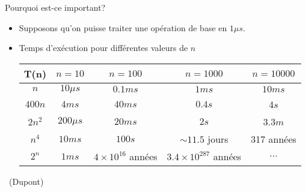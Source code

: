 \begin{frame}{Pourquoi est-ce important?}

\begin{itemize}
\item Supposons qu'on puisse traiter une opération de base en $1\mu s$.
\item Temps d'exécution pour différentes valeurs de $n$

\bigskip

\begin{center}
\footnotesize
\begin{tabular}{ccccc}
\hline
T(n) & $n=10$ & $n=100$ & $n=1000$ & $n=10000$\\
\hline
$n$ & $10\mu s$ & $0.1ms$ & $1ms$ & $10ms$\\
$400n$ & $4ms$ & $40ms$ & $0.4s$ & 4$s$\\
$2n^2$ &$200\mu s$ & $20ms$ & $2s$ & 3.3$m$\\
$n^4$ &$10ms$& $100s$ & $\sim 11.5$ jours & 317 années\\
$2^n$ & $1ms$ & $4\times 10^{16}$ années & $3.4\times 10^{287}$ années & $\ldots$\\
\hline
\end{tabular}
\end{center}

\end{itemize}

~\hfill{\scriptsize(Dupont)}

\end{frame}

